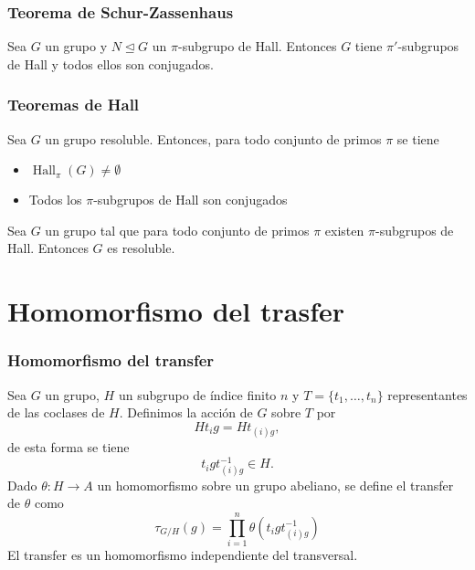 \documentclass[
	11pt, %
]{beamer}
\DeclareMathOperator{\SylowSubgroup}{Syl}
\DeclareMathOperator{\HallSubgroup}{Hall}
\newcommand{\Syl}[2]{\SylowSubgroup_{#1}(#2)}
\newcommand{\Hall}[2]{\HallSubgroup_{#1}(#2)}
\newcommand{\norm}{\trianglelefteq}
\newcommand{\ord}[1]{\left|#1\right|}%
\newcommand{\homo}[3]{#1\colon #2\to #3}
\newcommand{\extension}[5]{1\xrightarrow{} #3 \xrightarrow{#1} #4\xrightarrow{#2} #5 \xrightarrow{} 1}
\newcommand{\transversal}[2]{\{#1_1,\ldots,#1_#2\}}
\newcommand{\transfer}[2]{\tau_{#1/ #2}}
\begin{document}
\begin{frame}
	\frametitle{Teorema de Schur-Zassenhaus}
	
	\begin{theorem}
		Sea $G$ un grupo y $N\norm G$ un $\pi$-subgrupo de Hall. Entonces $G$ tiene $\pi'$-subgrupos de Hall y todos ellos son conjugados.
	\end{theorem}
	
%	
\end{frame}

\begin{frame}
	\frametitle{Teoremas de Hall}
	
	\begin{theorem}
		Sea $G$ un grupo resoluble. Entonces, para todo conjunto de primos $\pi$ se tiene
		\begin{itemize}
			 \item $\Hall \pi G \neq \emptyset$
			 \item Todos los $\pi$-subgrupos de Hall son conjugados
		\end{itemize}
	\end{theorem}
	\pause
	\begin{theorem}
		Sea $G$ un grupo tal que para todo conjunto de primos $\pi$ existen $\pi$-subgrupos de Hall. Entonces $G$ es resoluble.
	\end{theorem}
	
\end{frame}





\section{Homomorfismo del trasfer}

\begin{frame}
	\frametitle{Homomorfismo del transfer}
	Sea $G$ un grupo, $H$ un subgrupo de índice finito $n$ y $T = \transversal t n$ representantes de las coclases de $H$.
	Definimos la acción de $G$ sobre $T$ por
	$$
		Ht_i g = Ht_{(i)g},
	$$
	\pause
	de esta forma se tiene
	$$
		t_igt_{(i)g}^{-1}\in H.
	$$
	\pause
	Dado $\homo \theta H A$ un homomorfismo sobre un grupo abeliano, se define el transfer de $\theta$ como
	$$
		{\transfer G H}(g) = \prod_{i=1}^n \theta\left(t_igt_{(i)g}^{-1}\right)
	$$
	\pause
	El transfer es un homomorfismo independiente del transversal.
\end{frame}
\end{document}
